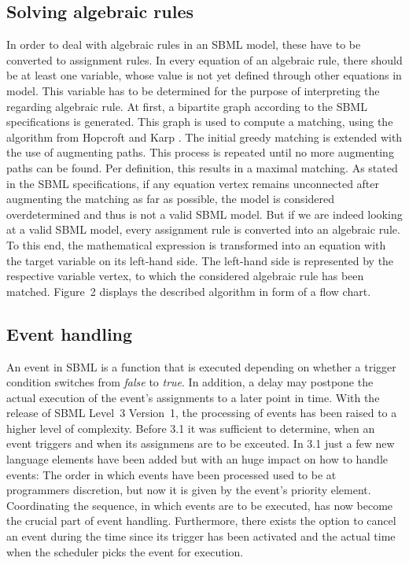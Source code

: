 \documentclass[10pt]{bmc_article}
\newenvironment{bmcformat}{\baselineskip20pt\sloppy\setboolean{publ}{false}}{\baselineskip20pt\sloppy}
\newcommand{\true}{\emph{true}}
\newcommand{\false}{\emph{false}}
\begin{document}
\begin{bmcformat}
\subsection*{Solving algebraic rules}
In order to deal with algebraic rules in an SBML model, these have to be converted to assignment rules.
In every equation of an algebraic rule, there should be at least one variable, 
whose value is not yet defined through other equations in model. This variable has to be determined 
for the purpose of interpreting the regarding algebraic rule. 
At first, a bipartite graph according to the SBML specifications is generated. This graph is used to 
compute a matching, using the algorithm from Hopcroft and Karp
\cite{hopcroft1973n}. The initial greedy matching is extended with the use of augmenting paths. This process is
repeated until no more augmenting paths can be found. Per definition, this results in a maximal matching. 
As stated in the SBML specifications, if any equation vertex remains unconnected after augmenting the 
matching as far as possible, the model is considered overdetermined and thus is not a valid SBML model. 
But if we are indeed looking at a valid SBML model, every assignment rule is converted into an algebraic rule. 
To this end, the mathematical expression is transformed into an equation with the target variable on its left-hand side.
The left-hand side is represented by the respective variable vertex, to which the considered algebraic rule has been matched.
Figure~2 displays the described algorithm in form of a flow chart.


\subsection*{Event handling}
An event in SBML is a function that is executed depending on whether a trigger condition switches from \false{} to
\true.
In addition, a delay may postpone the actual execution of the event's assignments to a later point in time.
With the release of SBML Level~3 Version~1, the processing of events has been raised to a higher level of complexity.
Before 3.1 it was sufficient to determine, when an event triggers and when its assignmens are to be exceuted.
In 3.1 just a few new language elements have been added but with an huge impact on how to handle events:
The order in which events have been processed used to be at programmers discretion, but now it is given by the event's priority element.
Coordinating the sequence, in which events are to be executed, has now become the crucial part of event handling. 
Furthermore, there exists the option to cancel an event during the time since its trigger 
has been activated and the actual time when the scheduler picks the event for execution.


\end{bmcformat}
\end{document}
